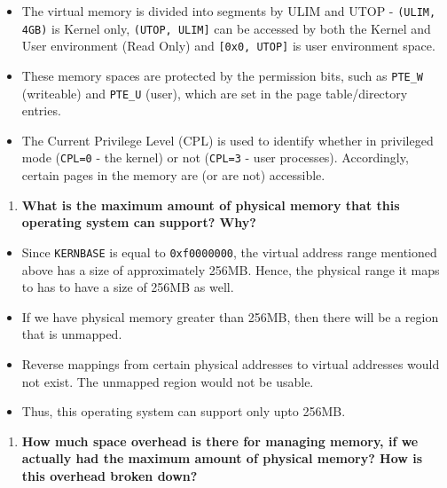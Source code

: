 \documentclass[]{article}
\begin{document}
\begin{itemize}
\itemsep1pt\parskip0pt
\item
  The virtual memory is divided into segments by ULIM and UTOP -
  \texttt{(ULIM, 4GB)} is Kernel only, \texttt{(UTOP, ULIM{]}} can be
  accessed by both the Kernel and User environment (Read Only) and
  \texttt{{[}0x0, UTOP{]}} is user environment space.
\item
  These memory spaces are protected by the permission bits, such as
  \texttt{PTE\_W} (writeable) and \texttt{PTE\_U} (user), which are set
  in the page table/directory entries.
\item
  The Current Privilege Level (CPL) is used to identify whether in
  privileged mode (\texttt{CPL=0} - the kernel) or not (\texttt{CPL=3} -
  user processes). Accordingly, certain pages in the memory are (or are
  not) accessible.
\end{itemize}

\begin{enumerate}
\def\labelenumi{\arabic{enumi}.}
\setcounter{enumi}{3}
\itemsep1pt\parskip0pt
\item
  \textbf{What is the maximum amount of physical memory that this
  operating system can support? Why?}
\end{enumerate}

\begin{itemize}
\itemsep1pt\parskip0pt
\item
  Since \texttt{KERNBASE} is equal to \texttt{0xf0000000}, the virtual
  address range mentioned above has a size of approximately 256MB.
  Hence, the physical range it maps to has to have a size of 256MB as
  well.
\item
  If we have physical memory greater than 256MB, then there will be a
  region that is unmapped.
\item
  Reverse mappings from certain physical addresses to virtual addresses
  would not exist. The unmapped region would not be usable.
\item
  Thus, this operating system can support only upto 256MB.
\end{itemize}

\begin{enumerate}
\def\labelenumi{\arabic{enumi}.}
\setcounter{enumi}{4}
\itemsep1pt\parskip0pt
\item
  \textbf{How much space overhead is there for managing memory, if we
  actually had the maximum amount of physical memory? How is this
  overhead broken down?}
\end{enumerate}
\end{document}
